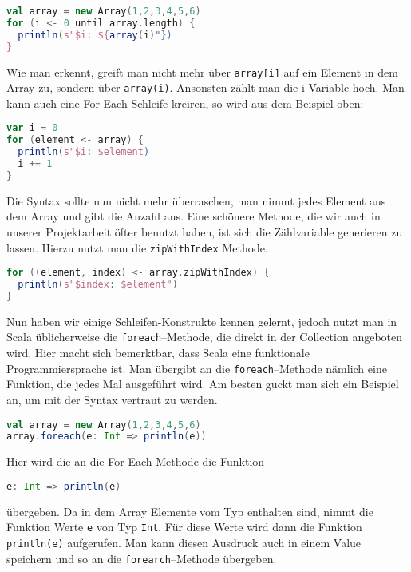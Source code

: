 \begin{lstlisting}[language=Scala]
val array = new Array(1,2,3,4,5,6)
for (i <- 0 until array.length) {
  println(s"$i: ${array(i)"})
}
\end{lstlisting}

Wie man erkennt, greift man nicht mehr über \texttt{array[i]} auf ein Element in dem Array zu, sondern über \texttt{array(i)}. Ansonsten zählt man die i Variable hoch. Man kann auch eine For-Each Schleife kreiren, so wird aus dem Beispiel oben:

\begin{lstlisting}[language=Scala,caption=For--Each in Scala]
var i = 0
for (element <- array) {
  println(s"$i: $element)
  i += 1
}
\end{lstlisting}

Die Syntax sollte nun nicht mehr überraschen, man nimmt jedes Element aus dem Array und gibt die Anzahl aus. Eine schönere Methode, die wir auch in unserer Projektarbeit öfter benutzt haben, ist sich die Zählvariable generieren zu lassen. Hierzu nutzt man die \texttt{zipWithIndex} Methode.

\begin{lstlisting}[language=Scala]
for ((element, index) <- array.zipWithIndex) {
  println(s"$index: $element")
}
\end{lstlisting}

Nun haben wir einige Schleifen-Konstrukte kennen gelernt, jedoch nutzt man in Scala üblicherweise die \texttt{foreach}--Methode, die direkt in der Collection angeboten wird. Hier macht sich bemerktbar, dass Scala eine funktionale Programmiersprache ist. Man übergibt an die \texttt{foreach}--Methode nämlich eine Funktion, die jedes Mal ausgeführt wird. Am besten guckt man sich ein Beispiel an, um mit der Syntax vertraut zu werden.

\begin{lstlisting}[language=Scala]
val array = new Array(1,2,3,4,5,6)
array.foreach(e: Int => println(e))
\end{lstlisting}

Hier wird die an die For-Each Methode die Funktion

\begin{lstlisting}[language=Scala,numbers=none]
e: Int => println(e)
\end{lstlisting}

übergeben. Da in dem Array Elemente vom Typ enthalten sind, nimmt die Funktion Werte \texttt{e} von Typ \texttt{Int}. Für diese Werte wird dann die Funktion \texttt{println(e)} aufgerufen. Man kann diesen Ausdruck auch in einem Value speichern und so an die \texttt{forearch}--Methode übergeben.

